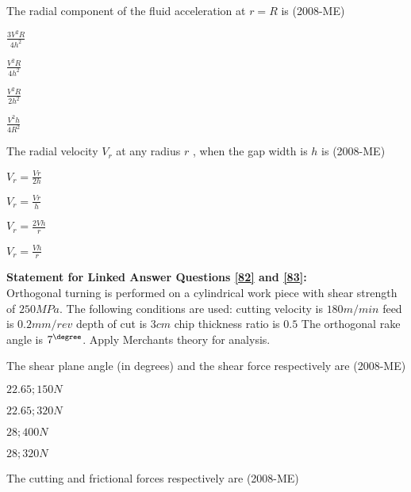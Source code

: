  \item The radial component of the fluid acceleration at $r = R$
 is \label{80} \hfill(2008-ME)
 \begin{enumerate}
     \begin{multicols}{4}
         \item $\frac{3V^2R}{4h^2}$
         \item $\frac{V^2R}{4h^2}$
         \item $\frac{V^2R}{2h^2}$
         \item $\frac{V^2h}{4R^2}$
     \end{multicols}
 \end{enumerate}
\item The radial velocity $V_r$
 at any radius $r$
, when the gap width is $h$
 is \label{81} \hfill(2008-ME)
 \begin{enumerate}
 \begin{multicols}{4}
     \item $V_r = \frac{V r}{2h}$
      \item $V_r = \frac{V r}{h}$
       \item $V_r = \frac{2V h}{r}$
        \item $V_r = \frac{V h}{r}$
 \end{multicols}
 \end{enumerate}
 \textbf{Statement for Linked Answer Questions \ref{82} and \ref{83}:} \\
 Orthogonal turning is performed on a cylindrical work piece with shear strength of $250MPa.$
 The following conditions are used: cutting velocity is $180m/min$
 feed is $0.2mm/rev$
 depth of cut is $3cm$
 chip thickness ratio is $0.5$
 The orthogonal rake angle is $7^{\degree}$.
 Apply Merchants theory for analysis. \\
 \item The shear plane angle (in degrees) and the shear force respectively are \label{82} \hfill(2008-ME)
 \begin{enumerate}
     \begin{multicols}{2}
         \item $22.65;150N$
         \item $22.65;320N$
         \item $28;400N$
         \item $28;320N$
     \end{multicols}
 \end{enumerate}
 \item The cutting and frictional forces respectively are \label{83} \hfill(2008-ME)
